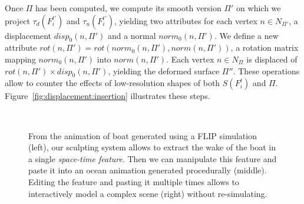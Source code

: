 \documentclass[review]{acmsiggraph}
\begin{document}
Once $\Pi$ has been computed, we compute its smooth version $\Pi'$ on which we project $\tau_d(F^{t'}_i)$ and $\tau_n(F^{t'}_i)$, yielding two attributes for each vertex $n \in N_{\Pi'}$, a displacement $disp_0(n, \Pi')$ and a normal $norm_0(n, \Pi')$.
We define a new attribute $rot(n, \Pi') = rot(norm_0(n, \Pi'), norm(n, \Pi'))$, a rotation matrix mapping $norm_0(n, \Pi')$ into $norm(n, \Pi')$.
Each vertex $n \in N_{\Pi}$ is displaced of $rot(n, \Pi') \times disp_0(n, \Pi')$, yielding the deformed surface $\Pi''$.
These operations allow to counter the effects of low-resolution shapes of both $S(F^t_i)$ and $\Pi$. Figure~\ref{fig:displacement:insertion} illustrates these steps.

\begin{figure}[th!]
     \centering
 ~
 ~
 ~
                      \caption{\label{fig:result:boatWake}
         From the animation of boat generated using a FLIP simulation (left), our sculpting system allows to extract the wake of the boat in a single \emph{space-time feature}. Then we can manipulate this feature and paste it into an ocean animation generated procedurally (middle). Editing the feature and pasting it multiple times allows to interactively model a complex scene (right) without re-simulating.
     }

\end{figure}
\end{document}
